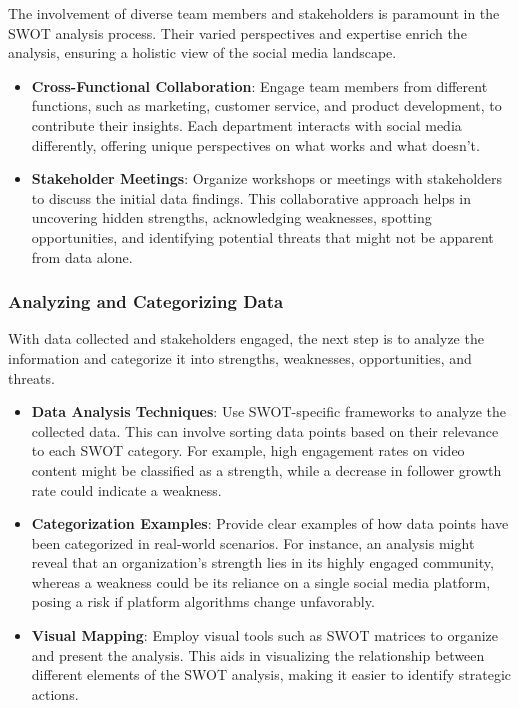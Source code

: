 \documentclass[
]{book}
\providecommand{\tightlist}{%
  \setlength{\itemsep}{0pt}\setlength{\parskip}{0pt}}
\begin{document}
The involvement of diverse team members and stakeholders is paramount in the SWOT analysis process. Their varied perspectives and expertise enrich the analysis, ensuring a holistic view of the social media landscape.

\begin{itemize}
\tightlist
\item
  \textbf{Cross-Functional Collaboration}: Engage team members from different functions, such as marketing, customer service, and product development, to contribute their insights. Each department interacts with social media differently, offering unique perspectives on what works and what doesn't.
\item
  \textbf{Stakeholder Meetings}: Organize workshops or meetings with stakeholders to discuss the initial data findings. This collaborative approach helps in uncovering hidden strengths, acknowledging weaknesses, spotting opportunities, and identifying potential threats that might not be apparent from data alone.
\end{itemize}

\hypertarget{analyzing-and-categorizing-data}{%
\subsubsection*{Analyzing and Categorizing Data}\label{analyzing-and-categorizing-data}}

With data collected and stakeholders engaged, the next step is to analyze the information and categorize it into strengths, weaknesses, opportunities, and threats.

\begin{itemize}
\tightlist
\item
  \textbf{Data Analysis Techniques}: Use SWOT-specific frameworks to analyze the collected data. This can involve sorting data points based on their relevance to each SWOT category. For example, high engagement rates on video content might be classified as a strength, while a decrease in follower growth rate could indicate a weakness.
\item
  \textbf{Categorization Examples}: Provide clear examples of how data points have been categorized in real-world scenarios. For instance, an analysis might reveal that an organization's strength lies in its highly engaged community, whereas a weakness could be its reliance on a single social media platform, posing a risk if platform algorithms change unfavorably.
\item
  \textbf{Visual Mapping}: Employ visual tools such as SWOT matrices to organize and present the analysis. This aids in visualizing the relationship between different elements of the SWOT analysis, making it easier to identify strategic actions.
\end{itemize}
\end{document}
